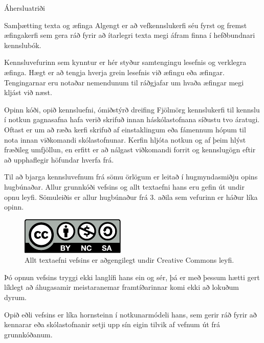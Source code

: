\documentclass[final]{beamer}
\begin{document}
\begin{frame}
\begin{tcolorbox}[standard jigsaw, height=97cm, colframe=orange, opacityback=0, sharp corners=all]
\begin{columns}[t]
\begin{column}{.47\linewidth}
\begin{block}{Áhersluatriði}
    \begin{subblock}{Samþætting texta og æfinga}
        Algengt er að vefkennslukerfi séu fyrst og fremst æfingakerfi sem gera ráð fyrir að ítarlegri texta megi áfram finna í hefðbundnari kennslubók.

        Kennsluvefurinn sem kynntur er hér styður samtengingu lesefnis og verklegra æfinga. Hægt er að tengja hverja grein lesefnis við æfingu eða æfingar. Tengingarnar eru notaðar nemendunum til ráðgjafar um hvaða æfingar megi kljást við næst.
    \end{subblock}

    \begin{subblock}{Opinn kóði, opið kennsluefni, ómiðstýrð dreifing}
        Fjölmörg kennslukerfi til kennslu í notkun gagnasafna hafa verið skrifuð innan háskólastofnana síðustu tvo áratugi. Oftast er um að ræða kerfi skrifuð af einstaklingum eða fámennum hópum til nota innan viðkomandi skólastofnunar. Kerfin hljóta notkun og af þeim hlýst fræðileg umfjöllun, en erfitt er að nálgast viðkomandi forrit og kennslugögn eftir að upphaflegir höfundar hverfa frá.
        
        Til að bjarga kennsluvefnum frá sömu örlögum er leitað í hugmyndasmiðju opins hugbúnaðar. Allur grunnkóði vefsins og allt textaefni hans eru gefin út undir opnu leyfi. Sömuleiðis er allur hugbúnaður frá 3. aðila sem vefurinn er háður líka opinn.
        \begin{figure}
            \caption{Allt textaefni vefsins er aðgengilegt undir Creative Commons leyfi.}
            \includegraphics[width=0.3\linewidth]{cc-by-nc-sa}
        \end{figure}

        Þó opnun vefsins tryggi ekki langlífi hans ein og sér, þá er með þessum hætti gert líklegt að áhugasamir meistaranemar framtíðarinnar komi ekki að lokuðum dyrum.

        Opið eðli vefsins er líka hornsteinn í notkunarmódeli hans, sem gerir ráð fyrir að kennarar eða skólastofnanir setji upp sín eigin tilvik af vefnum út frá grunnkóðanum.
    \end{subblock}

\end{block}

\end{column}


\end{columns}
\end{tcolorbox}
\end{frame}
\end{document}
